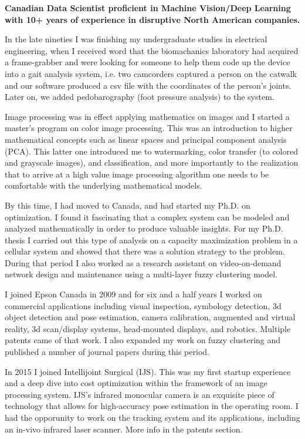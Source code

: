 \onehalfspace
\textbf{\large Canadian Data Scientist proficient in Machine Vision/Deep Learning with 10+ years of experience in 
disruptive North American companies.}
\singlespace

\vspace{1cm}

In the late nineties I was finishing my undergraduate studies in electrical engineering, when I received word that
the biomachanics laboratory had acquired a frame-grabber and were looking for someone to help them code up the device
into a gait analysis system, i.e. two camcorders captured a person on the catwalk and our software produced 
a csv file with the coordinates of the person's joints. Later on, we added pedobarography (foot pressure analysis) to the 
system. 

Image processing was in effect applying mathematics on images and I started a master's program on color image processing. 
This was an introduction to higher mathematical concepts such as linear spaces and principal component analysis (PCA). This
latter one introduced me to watermarking, color transfer (to colored and grayscale images), and classification, and more 
importantly to the realization that to arrive at a high value image processing algorithm one needs to be comfortable with
the underlying mathematical models. 

By this time, I had moved to Canada, and had started my Ph.D. on optimization. I found it fascinating that a complex system can be 
modeled and analyzed mathematically in order to produce valuable insights. For my Ph.D. thesis I carried out this type of 
analysis on a capacity maximization problem in a cellular system and showed that there was a solution strategy to the problem. 
During that period I also worked as a research assistant on video-on-demand network design and maintenance using a multi-layer 
fuzzy clustering model.

I joined Epson Canada in 2009 and for six and a half years I worked on commercial applications including visual inspection, 
symbology detection, 3d object detection and pose estimation, camera calibration, augmented and virtual reality, 3d scan/display 
systems, head-mounted displays, and robotics. Multiple patents came of that work. I also expanded my work on fuzzy clustering 
and published a number of journal papers during this period.

In 2015 I joined Intellijoint Surgical (IJS). This was my first startup experience and a deep dive into cost optimization within 
the framework of an image processing system. IJS's infrared monocular camera is an exquisite piece of technology that allows for 
high-accuracy pose estimation in the operating room. I had the opporunity to work on the tracking system and its applications, including 
an in-vivo infrared laser scanner. More info in the patents section.

